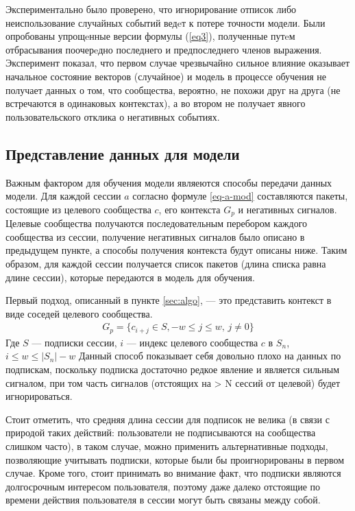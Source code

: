 \documentclass[times,specification,annotation]{itmo-student-thesis}
\begin{document}
Экспериментально было проверено, что игнорирование отписок либо неиспользование случайных событий ведeт к потере точности модели. Были опробованы упрощeнные версии формулы (\ref{eq3}), полученные путeм отбрасывания
поочерeдно последнего и предпоследнего членов выражения. Эксперимент показал, что первом случае чрезвычайно сильное
влияние оказывает начальное состояние векторов (случайное) и модель в процессе обучения не получает данных о том, что сообщества, вероятно,
не похожи друг на друга (не встречаются в одинаковых контекстах), а во втором не получает явного пользовательского отклика о негативных событиях. 

\subsection{Представление данных для модели}\label{sec:dataf}

Важным фактором для обучения модели являеются способы передачи данных модели. Для каждой сессии $a$ согласно формуле \ref{eq-a-mod} составляются пакеты, состоящие из целевого сообщества $c$, его контекста $G_p$ и негативных сигналов. Целевые сообщества получаются последовательным перебором каждого сообщества из сессии, получение негативных сигналов было описано в предыдущем пункте, а способы получения контекста будут описаны ниже. Таким образом, для каждой сессии получается список пакетов (длина списка равна длине сессии), которые передаются в модель для обучения.

Первый подход, описанный в пункте \ref{sec:algo}, --- это представить контекст в виде соседей целевого сообщества. 
\begin{align}
G_p =\{c_{i + j} \in S, -w \leq j \leq w,\, j \ne 0\} \label{eq4}
\end{align}
Где $S$ --- подписки сессии, $i$ --- индекс целевого сообщества $c$ в $S_n$, $i \leq w \leq |S_n| - w$
Данный способ показывает себя довольно плохо на данных по подпискам, поскольку подписка
достаточно редкое явление и является сильным сигналом, при том часть сигналов
(отстоящих на > N сессий от целевой) будет игнорироваться.

Стоит отметить, что средняя длина сессии для подписок не велика (в связи с природой таких действий: пользователи не подписываются на сообщества слишком часто), в таком случае, можно применить альтернативные подходы, позволяющие учитывать подписки, которые были бы проигнорированы в первом случае. Кроме того, стоит принимать во внимание факт, что подписки являются долгосрочным интересом пользователя, поэтому даже далеко отстоящие по времени действия пользователя в сессии могут быть связаны между собой.
\end{document}
